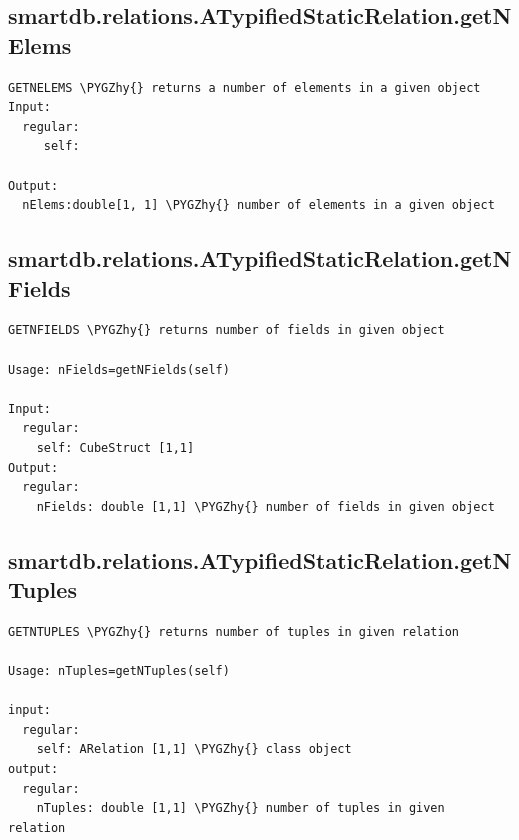 \documentclass[letterpaper,10pt,english]{sphinxmanual}
\def\PYGZhy{\char`\-}
\begin{document}
\subsection{smartdb.relations.ATypifiedStaticRelation.getNElems}
\label{chap_functions:smartdb-relations-atypifiedstaticrelation-getnelems}
\begin{Verbatim}[commandchars=\\\{\}]
GETNELEMS \PYGZhy{} returns a number of elements in a given object
Input:
  regular:
     self:

Output:
  nElems:double[1, 1] \PYGZhy{} number of elements in a given object
\end{Verbatim}


\subsection{smartdb.relations.ATypifiedStaticRelation.getNFields}
\label{chap_functions:smartdb-relations-atypifiedstaticrelation-getnfields}
\begin{Verbatim}[commandchars=\\\{\}]
GETNFIELDS \PYGZhy{} returns number of fields in given object

Usage: nFields=getNFields(self)

Input:
  regular:
    self: CubeStruct [1,1]
Output:
  regular:
    nFields: double [1,1] \PYGZhy{} number of fields in given object
\end{Verbatim}


\subsection{smartdb.relations.ATypifiedStaticRelation.getNTuples}
\label{chap_functions:smartdb-relations-atypifiedstaticrelation-getntuples}
\begin{Verbatim}[commandchars=\\\{\}]
GETNTUPLES \PYGZhy{} returns number of tuples in given relation

Usage: nTuples=getNTuples(self)

input:
  regular:
    self: ARelation [1,1] \PYGZhy{} class object
output:
  regular:
    nTuples: double [1,1] \PYGZhy{} number of tuples in given  relation
\end{Verbatim}
\end{document}
